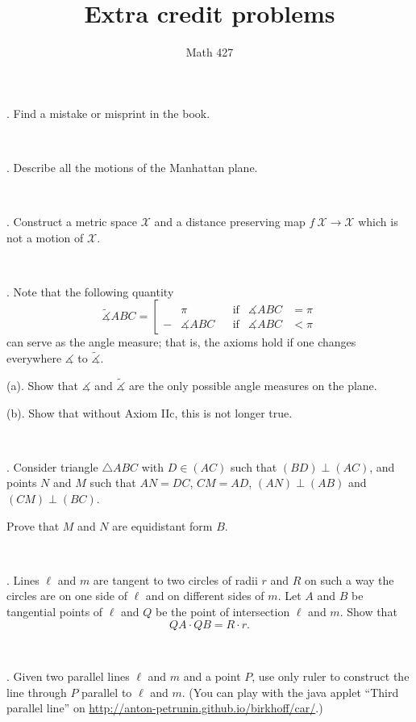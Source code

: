 \documentclass[oneside,a4paper]{article}
\begin{document}
\title{Extra credit problems}
\author{Math 427}
\date{}
\maketitle

\textit{}

. Find a mistake or misprint in the book.

\ 

. Describe all the motions of the Manhattan plane.

\ 

. Construct a metric space $\mathcal X$ and a distance preserving map $f\:\mathcal X\to \mathcal X$ which is not a motion of $\mathcal X$.

\ 

. Note that the following quantity 
$$\tilde
\measuredangle ABC=\left[
\begin{aligned}
&\pi&&\text{if}&\measuredangle ABC&=\pi
\\
-&\measuredangle ABC&&\text{if}&\measuredangle ABC&<\pi
\end{aligned}
\right.$$
can serve as the angle measure; 
that is, the axioms hold if one changes everywhere $\measuredangle$ to $\tilde\measuredangle$.

\noi (a). Show that $\measuredangle$ and $\tilde\measuredangle$ are the only possible angle measures on the plane. 

\noi (b). Show that without Axiom IIc, this is not longer true.

\ 

. Consider triangle $\triangle A B C$ with $D\in (A C)$ such that $(BD)\perp (AC)$, and points $N$ and $M$ such that $AN=DC$, $CM=AD$, $(AN)\perp(AB)$ and $(CM)\perp(BC)$.

Prove that $M$ and $N$ are equidistant form $B$.

\ 

.  Lines $\ell$ and $m$ are tangent to two circles of radii $r$ and $R$ on such
a way the circles are on one side of $\ell$ and on different sides of $m$. 
Let $A$ and $B$ be
tangential points of $\ell$ and $Q$ be the point of intersection $\ell$ and $m$. 
Show that
$$QA\cdot QB = R\cdot r.$$

\ 

. Given two parallel lines $\ell$ and $m$ and a point $P$, use only ruler to construct the line through $P$ parallel to $\ell$ and $m$.
(You can play with the java applet ``Third parallel line'' on  \href{http://anton-petrunin.github.io/birkhoff/car/}{http://anton-petrunin.github.io/birkhoff/car/}.)
\end{document}
